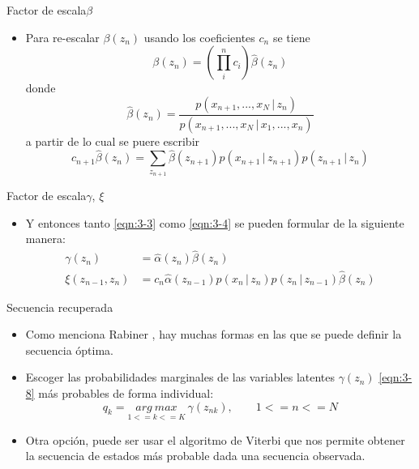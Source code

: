 \begin{frame}{Factor de escala}{$\beta$}
  \begin{itemize}
    \itemsep1em    
    \item Para re-escalar $\beta(z_n)$ usando los coeficientes $c_n$ se tiene
      \begin{equation}
        \beta(z_n) = \left( \prod_i^n c_i \right) \hat \beta(z_n)
        \label{eqn:3-26}
      \end{equation}
    donde 
      \begin{equation}
        \hat \beta(z_n) = 
          \frac{p(x_{n+1}, ..., x_N \,|\, z_n)}
          {p(x_{n+1}, ..., x_N \,|\, x_1, ..., x_n)}
        \label{eqn:3-27}
      \end{equation}
    a partir de lo cual se puere escribir
      \begin{equation}
        c_{n+1} \hat \beta(z_n) = \sum_{z_{n+1}} \hat \beta(z_{n+1})
          p(x_{n+1} \,|\, z_{n+1}) p(z_{n+1} \,|\, z_n)    
        \label{eqn:3-28}
      \end{equation}
  \end{itemize}
\end{frame}    

\begin{frame}{Factor de escala}{$\gamma$, $\xi$}
  \begin{itemize}
    \itemsep1em    
    \item Y entonces tanto \eqref{eqn:3-3} como \eqref{eqn:3-4} se pueden formular de la siguiente manera: 
      \begin{align}
        \gamma(z_n) &= \hat \alpha(z_n) \hat \beta(z_n) \\
        \xi(z_{n-1}, z_n) &= c_n \hat \alpha(z_{n-1}) p(x_n \,|\, z_n) 
            p(z_n \,|\, z_{n-1}) \hat \beta(z_n) 
        \label{eqn:3-30}      
      \end{align}
    \end{itemize}
\end{frame}    

\begin{frame}{Secuencia recuperada}
  \begin{itemize}
    \itemsep1em    
    \item 
    Como menciona Rabiner \cite{Rabiner1989}, hay muchas formas en las que se puede definir la secuencia óptima.

    \item
     Escoger las probabilidades marginales de las variables latentes $\gamma(z_n)$ \eqref{eqn:3-8} más probables de forma individual:
    \begin{equation}
    q_k = \underset{1 <= k <= K}{arg~max}~ \gamma(z_{nk}), \quad \quad 1 <= n <= N
    \label{eqn:3-31}
    \end{equation}

    \item
    Otra opción, puede ser usar el algoritmo de Viterbi que nos permite obtener la secuencia de estados más probable dada una secuencia observada. 
  \end{itemize}
\end{frame}